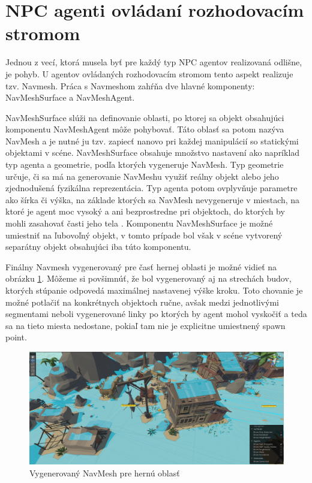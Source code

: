 \documentclass[slovak, master]{diploma}
\begin{document}
\section{NPC agenti ovládaní rozhodovacím stromom}
\label{sec:AgentsWithTrees}
Jednou z vecí, ktorá musela byť pre každý typ NPC agentov realizovaná odlišne, je pohyb. U agentov ovládaných rozhodovacím stromom tento aspekt realizuje tzv. Navmesh. Práca s Navmeshom zahŕňa dve hlavné komponenty: NavMeshSurface a NavMeshAgent. 

NavMeshSurface slúži na definovanie oblasti, po ktorej sa objekt obsahujúci komponentu NavMeshAgent môže pohybovať. Táto oblasť sa potom nazýva NavMesh a je nutné ju tzv. zapiecť nanovo pri každej manipulácií so statickými objektami v scéne. NavMeshSurface obsahuje množstvo nastavení ako napríklad typ agenta a geometrie, podľa ktorých vygeneruje NavMesh. Typ geometrie určuje, či sa má na generovanie NavMeshu využiť reálny objekt alebo jeho zjednodušená fyzikálna reprezentácia. Typ agenta potom ovplyvňuje parametre ako šírka či výška, na základe ktorých sa NavMesh nevygeneruje v miestach, na ktoré je agent moc vysoký a ani bezprostredne pri objektoch, do ktorých by mohli zasahovať časti jeho tela \cite{NavMeshSurface}. Komponentu NavMeshSurface je možné umiestniť na ľubovoľný objekt, v tomto prípade bol však v scéne vytvorený separátny objekt obsahujúci iba túto komponentu. 

Finálny Navmesh vygenerovaný pre časť hernej oblasti je možné vidieť na obrázku \ref{pic:NavMesh}. Môžeme si povšimnúť, že bol vygenerovaný aj na strechách budov, ktorých stúpanie odpovedá maximálnej nastavenej výške kroku. Toto chovanie je možné potlačiť na konkrétnych objektoch ručne, avšak medzi jednotlivými segmentami neboli vygenerované linky po ktorých by agent mohol vyskočiť a teda sa na tieto miesta nedostane, pokiaľ tam nie je explicitne umiestnený spawn point. 

\begin{figure}[!htbp]
    \centering
    \includegraphics[width=1\textwidth]{Figures/navmesh.png}
    \caption{Vygenerovaný NavMesh pre hernú oblasť}
    \label{pic:NavMesh}
\end{figure}
\end{document}
